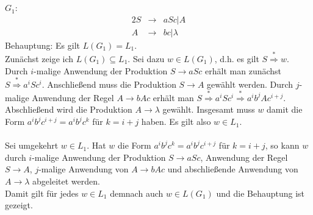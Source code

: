\documentclass[10pt,a4paper,oneside,ngerman,numbers=noenddot]{scrartcl}
\begin{document}
\section{} %
\subsection{} %
$G_{1}$:\\
\begin{alignat*}{2}
S &\rightarrow & aSc | A \\
A &\rightarrow & bc | \lambda
\end{alignat*}
Behauptung: Es gilt $L(G_{1}) = L_{1}$.\\
Zunächst zeige ich $L(G_{1}) \subseteq L_{1}$. Sei dazu $w \in L(G_{1})$, d.h. es gilt $S \overset{*}{\Longrightarrow} w$. Durch $i$-malige Anwendung der Produktion $S \rightarrow aSc$ erhält man zunächst $S \overset{*}{\Longrightarrow} a^{i}Sc^{i}$. Anschließend muss die Produktion $S \rightarrow A$ gewählt werden. Durch $j$-malige Anwendung der Regel $A \rightarrow bAc$ erhält man $S \overset{*}{\Longrightarrow} a^{i}Sc^{i} \overset{*}{\Longrightarrow} a^{i}b^{j}Ac^{i+j}$. Abschließend wird die Produktion $A \rightarrow \lambda$ gewählt. Insgesamt muss $w$ damit die Form $a^{i}b^{j}c^{i+j} = a^{i}b^{j}c^{k}$ für $k = i+j$ haben. Es gilt also $w \in L_{1}$.\\
\\
Sei umgekehrt $w \in L_{1}$. Hat $w$ die Form $a^{i}b^{j}c^{k} = a^{i}b^{j}c^{i+j}$ für $k = i+j$, so kann $w$ durch $i$-malige Anwendung der Produktion $S \rightarrow aSc$, Anwendung der Regel $S \rightarrow A$, $j$-malige Anwendung von $A \rightarrow bAc$ und abschließende Anwendung von $A \rightarrow \lambda$ abgeleitet werden.\\
Damit gilt für jedes $w \in L_{1}$ demnach auch $w \in L(G_{1})$ und die Behauptung ist gezeigt.
\subsection{} %

\section{} %
\end{document}
